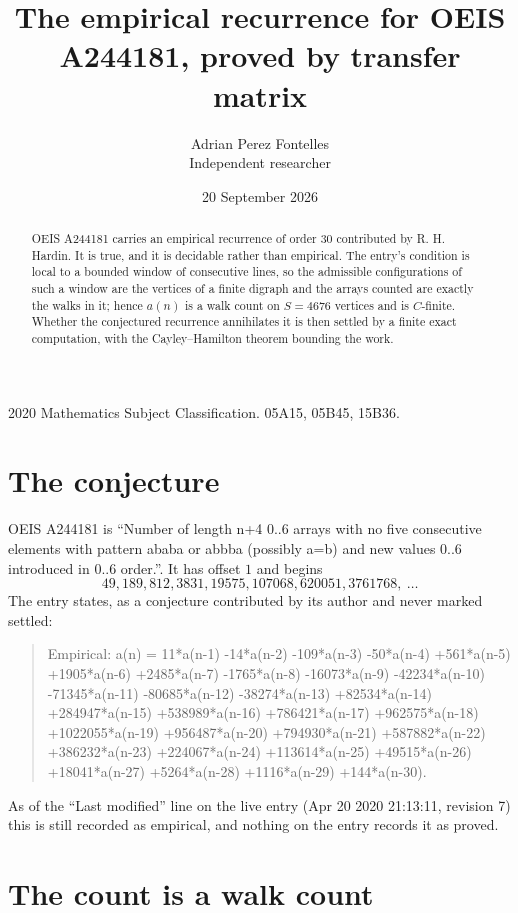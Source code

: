 \documentclass[11pt,a4paper]{article}
\title{The empirical recurrence for OEIS A244181, proved by transfer matrix}
\author{Adrian Perez Fontelles\\ \small Independent researcher}
\date{20 September 2026}
\theoremstyle{plain}
\theoremstyle{definition}
\begin{document}
\maketitle

\begin{abstract}
OEIS A244181 carries an empirical recurrence of order $30$ contributed by R. H. Hardin. It is
true, and it is decidable rather than empirical. The entry's condition is local to a bounded window of consecutive lines, so
the admissible configurations of such a window are the vertices of a finite digraph and the
arrays counted are exactly the walks in it; hence $a(n)$ is a walk count on $S=4676$ vertices
and is $C$-finite. Whether the conjectured recurrence annihilates it is then settled by a
finite exact computation, with the Cayley--Hamilton theorem bounding the work.
\end{abstract}

\noindent\small 2020 Mathematics Subject Classification. 05A15, 05B45, 15B36.\normalsize

\section{The conjecture}

OEIS A244181 is ``Number of length n+4 0..6 arrays with no five consecutive elements with pattern ababa or abbba (possibly a=b) and new values 0..6 introduced in 0..6 order.''. It has offset $1$ and begins
\[
49, 189, 812, 3831, 19575, 107068, 620051, 3761768,\ \dots
\]
The entry states, as a conjecture contributed by its author and never marked settled:
\begin{quote}\raggedright\small
Empirical: a(n) = 11*a(n-1) -14*a(n-2) -109*a(n-3) -50*a(n-4) +561*a(n-5) +1905*a(n-6) +2485*a(n-7) -1765*a(n-8) -16073*a(n-9) -42234*a(n-10) -71345*a(n-11) -80685*a(n-12) -38274*a(n-13) +82534*a(n-14) +284947*a(n-15) +538989*a(n-16) +786421*a(n-17) +962575*a(n-18) +1022055*a(n-19) +956487*a(n-20) +794930*a(n-21) +587882*a(n-22) +386232*a(n-23) +224067*a(n-24) +113614*a(n-25) +49515*a(n-26) +18041*a(n-27) +5264*a(n-28) +1116*a(n-29) +144*a(n-30).
\end{quote}
As of the ``Last modified'' line on the live entry (Apr 20 2020 21:13:11, revision 7) this is still
recorded as empirical, and nothing on the entry records it as proved.

\section{The count is a walk count}
\end{document}
